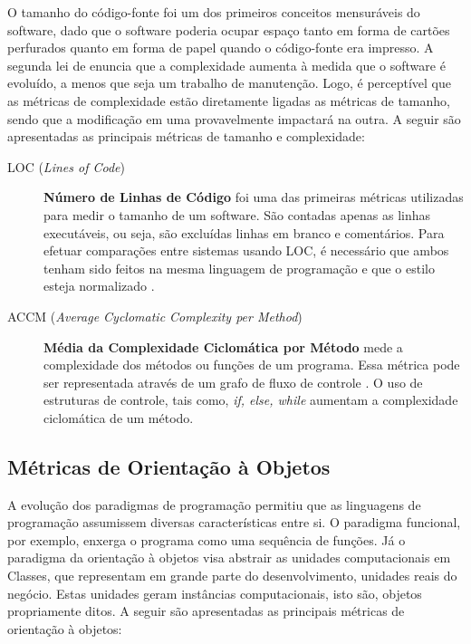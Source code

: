 \label{métricas tamanho e complexidade} 

O tamanho do código-fonte foi um dos primeiros conceitos mensuráveis do 
software, dado que o software poderia ocupar espaço tanto em forma de cartões 
perfurados quanto em forma de papel quando o código-fonte era impresso. 
A segunda lei de  enuncia que a complexidade aumenta à 
medida que o software é evoluído, a menos que seja um trabalho de manutenção. 
Logo, é perceptível que as métricas de complexidade estão diretamente ligadas as 
métricas de tamanho, sendo que a modificação em uma provavelmente impactará na 
outra. A seguir são apresentadas as principais métricas de tamanho e 
complexidade:


\begin{description}

	\item[LOC (\textit{Lines of Code})] \textbf{Número de Linhas de Código} 
	foi uma das primeiras métricas utilizadas para medir o tamanho de um 
	software. São contadas apenas as linhas executáveis, ou seja, são excluídas 
	linhas em branco e comentários. Para efetuar comparações entre sistemas 
	usando LOC, é necessário que ambos tenham sido feitos na mesma linguagem de 
	programação e que o estilo esteja normalizado \cite{Jones91}.
	
	\item[ACCM (\textit{Average Cyclomatic Complexity per Method})] \textbf{
	Média da Complexidade Ciclomática por Método} mede a complexidade dos 
	métodos ou funções de um programa. Essa métrica pode ser representada 
	através de um grafo de fluxo de controle \cite{McCabe76}. O uso de 
	estruturas de controle, tais como, \textit{if, else, while} aumentam a 
	complexidade ciclomática de um método.

\end{description}




\subsection{Métricas de Orientação à Objetos}
\label{métrica objetos}

A evolução dos paradigmas de programação permitiu que as linguagens de 
programação assumissem diversas características entre si. O paradigma 
funcional, por exemplo, enxerga o programa como uma sequência de funções. 
Já o paradigma da orientação à objetos visa abstrair as unidades computacionais em Classes, que representam em grande parte do desenvolvimento, unidades reais do negócio. Estas unidades geram instâncias computacionais, isto são, objetos propriamente ditos. A seguir são apresentadas 
as principais métricas de orientação à objetos:

